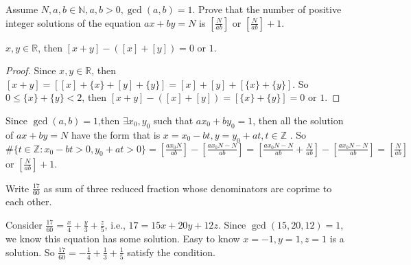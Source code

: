 \documentclass{ctexart}
\begin{document}
\begin{problem}\label{pro:p23.3}
  Assume \(N,a,b \in \mathbb{N},a,b>0,\gcd(a,b)=1\).
  Prove that the number of positive integer solutions of the equation \(ax+by=N\)
  is \(\left[\frac{N}{ab}\right]\) or \(\left[\frac{N}{ab}\right]+1\).
\end{problem}
\begin{lemma}\label{lem:23.3}
  \(x,y \in \mathbb{R}\), then \([x + y] -([x]+[y]) =0 \) or \(1\).
\end{lemma}
\begin{proof}
  Since \(x, y \in \mathbb{R}\), then \([x + y] =[[x] + \{x\} + [y] + \{y\}]=[x]+[y]+[\{x\}+\{y\}]\).
  So \(0 \leq \{x\}+\{y\} < 2\), then \([x + y] -([x]+[y]) = [\{x\} + \{y\}] =0 \) or \(1\).
\end{proof}

\begin{solution}
  Since \(\gcd(a,b)=1\),then \(\exists x_0,y_0\) such that \(ax_0 + by_0=1\), then all the solution of
  \(ax + by =N\) have the form that is \(x=x_0 - bt, y=y_0 + at, t \in \mathbb{Z}\) .
  So \(\#\{t \in \mathbb{Z}: x_0 -bt >0, y_0 +at >0\}= [\frac{ax_0N}{ab}]-[\frac{ax_0N-N}{ab}]=[\frac{ax_0N-N}{ab}+\frac{N}{ab}]-[\frac{ax_0N-N}{ab}]=[\frac{N}{ab}]\) or \([\frac{N}{ab}]+ 1\).
\end{solution}

\begin{problem}\label{pro:p24.2}
  Write \(\frac{17}{60}\) as sum of three reduced fraction whose denominators are coprime to each other.
\end{problem}
\begin{solution}
  Consider \(\frac{17}{60}=\frac{x}{4}+\frac{y}{3}+\frac{z}{5}\), i.e., \(17=15x+20y+12z\).
  Since \(\gcd(15,20,12)=1\), we know this equation has some solution.
  Easy to know \(x=-1,y=1,z=1\) is a solution.
  So \(\frac{17}{60}=-\frac{1}{4}+\frac{1}{3}+\frac{1}{5}\) satisfy the condition.
\end{solution}
\end{document}
